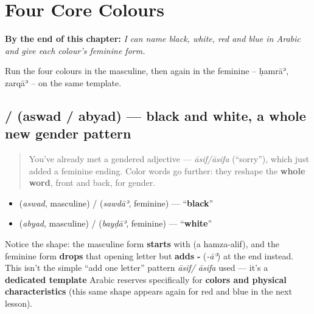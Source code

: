 
\chapter{Four Core Colours}
\label{ch:ar-core-colours}

\begin{chapteropening}
\textbf{By the end of this chapter:} \emph{I can name black, white, red and blue in Arabic and give each colour's feminine form.}

Run the four colours in the masculine, then again in the feminine -- ḥamrāʾ, zarqāʾ -- on the same template.
\end{chapteropening}

\section[\texorpdfstring{\ar{أسود} \ar{أبيض} (aswad abyad)}{أسود أبيض (aswad abyad)}]{ /  (aswad / abyad) — black and white, a whole new gender pattern}

\label{lesson:AR-C09-aswad-abyad}



\begin{quote}
You've already met a gendered adjective — \emph{āsif/āsifa} (\textquotedblleft{}sorry\textquotedblright{}), which just added a feminine ending. Color words go further: they reshape the \textbf{whole word}, front and back, for gender.
\end{quote}

\begin{grammarlens}[title={Grammar Lens — The pattern: masculine \ar{أ}‑‑‑ / feminine ‑‑‑\ar{اء}}]
\begin{itemize}
\raggedright
  \item \textbf{} (\emph{aswad}, masculine) / \textbf{} (\emph{sawdāʾ}, feminine) — \textquotedblleft{}\textbf{black}\textquotedblright{}
  \item \textbf{} (\emph{abyad}, masculine) / \textbf{} (\emph{bayḍāʾ}, feminine) — \textquotedblleft{}\textbf{white}\textquotedblright{}
\end{itemize}

Notice the shape: the masculine form \textbf{starts} with \textbf{} (a hamza-alif), and the feminine form \textbf{drops} that opening letter but \textbf{adds} \textbf{‑} (\emph{-āʾ}) at the end instead. This isn't the simple \textquotedblleft{}add one letter\textquotedblright{} pattern \emph{āsif/ āsifa} used — it's a \textbf{dedicated template} Arabic reserves specifically for \textbf{colors and physical characteristics} (this same shape appears again for red and blue in the next lesson).
\end{grammarlens}

